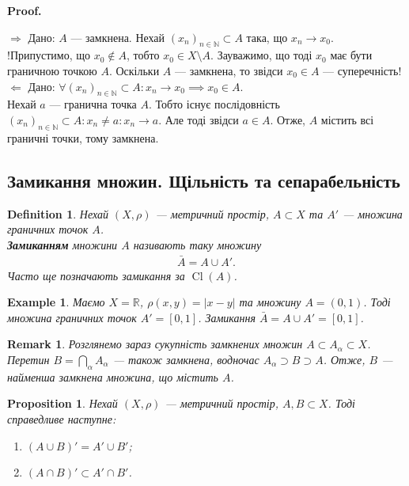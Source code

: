 \documentclass[a4paper, 10pt]{article}
\makeatletter
\def\rightproof{$\boxed{\Rightarrow}$ }
\def\leftproof{$\boxed{\Leftarrow}$ }
\theoremstyle{theoremdd}
\theoremstyle{theoremdd}
\newtheorem{definition}[theorem]{Definition}
\theoremstyle{theoremdd}
\theoremstyle{theoremdd}
\newtheorem{example}[theorem]{Example}
\theoremstyle{theoremdd}
\newtheorem{proposition}[theorem]{Proposition}
\theoremstyle{theoremdd}
\newtheorem{remark}[theorem]{Remark}
\theoremstyle{theoremdd}
\theoremstyle{theoremdd}
\renewenvironment{proof}[1][Proof.\\]{\par
\pushQED{\hfill \qed}%
\normalfont \topsep6\p@\@plus6\p@\relax
\trivlist
\item\relax
{\bfseries
#1\@addpunct{.}}\hspace\labelsep\ignorespaces
}{%
\popQED\endtrivlist\@endpefalse
}
\DeclareMathOperator{\Cl}{Cl}
\makeatother
\begin{document}
\begin{proof}
\rightproof Дано: $A$ --- замкнена. Нехай $(x_n)_{n \in \mathbb{N}} \subset A$ така, що $x_n \to x_0$.\\
!Припустимо, що $x_0 \notin A$, тобто $x_0 \in X \setminus A$. Зауважимо, що тоді $x_0$ має бути граничною точкою $A$. Оскільки $A$ --- замкнена, то звідси $x_0 \in A$ --- суперечність!
\bigskip \\
\leftproof Дано: $\forall (x_n)_{n \in \mathbb{N}} \subset A: x_n \to x_0 \implies x_0 \in A$.\\
Нехай $a$ --- гранична точка $A$. Тобто існує послідовність $(x_n)_{n \in \mathbb{N}} \subset A: x_n \neq a: x_n \to a$. Але тоді звідси $a \in A$. Отже, $A$ містить всі граничні точки, тому замкнена.
\end{proof}

\subsection{Замикання множин. Щільність та сепарабельність}
\begin{definition}
Нехай $(X,\rho)$ --- метричний простір, $A \subset X$ та $A'$ --- множина граничних точок $A$.\\
\textbf{Замиканням} множини $A$ називають таку множину
\begin{align*}
\bar{A} = A \cup A'.
\end{align*}
Часто ще позначають замикання за $\Cl(A)$.
\end{definition}

\begin{example}
Маємо $X = \mathbb{R}$, $\rho(x,y) = |x-y|$ та множину $A = (0,1)$. Тоді множина граничних точок $A' = [0,1]$. Замикання $\bar{A} = A \cup A' = [0,1]$.
\end{example}

\begin{remark}
Розглянемо зараз сукупність замкнених множин $A \subset A_{\alpha} \subset X$. Перетин $B = \displaystyle\bigcap_{\alpha} A_{\alpha}$ --- також замкнена, водночас $A_\alpha \supset B \supset A$. Отже, $B$ --- найменша замкнена множина, що містить $A$.
\end{remark}

\begin{proposition}
Нехай $(X,\rho)$ --- метричний простір, $A,B \subset X$. Тоді справедливе наступне:
\begin{enumerate}[nosep,wide=0pt,label={\arabic*)}]
\item $(A \cup B)' = A' \cup B'$;
\item $(A \cap B)' \subset A' \cap B'$.
\end{enumerate}
\end{proposition}
\end{document}
